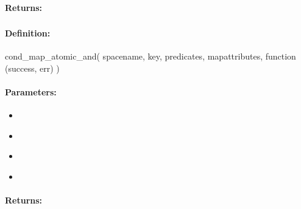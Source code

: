 \paragraph{Returns:}


\pagebreak
\subsubsection{}
\label{api:nodejs:cond_map_atomic_and}


\paragraph{Definition:}
\begin{javascriptcode}
cond_map_atomic_and(
        spacename, key, predicates, mapattributes, function (success, err) {})
\end{javascriptcode}
\paragraph{Parameters:}
\begin{itemize}[noitemsep]
\item {}\\

\item {}\\

\item {}\\

\item {}\\

\end{itemize}

\paragraph{Returns:}


\pagebreak
\subsubsection{}
\label{api:nodejs:group_map_atomic_and}


